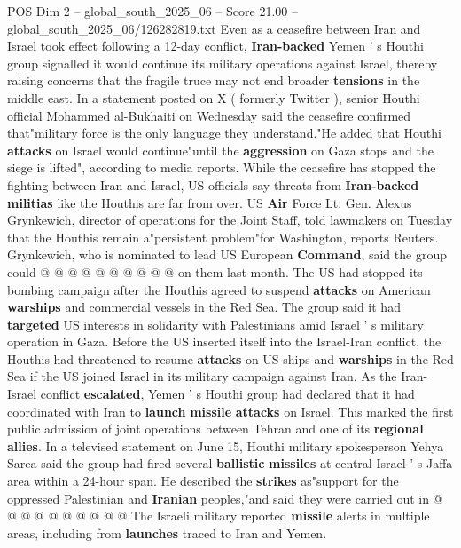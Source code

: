 \begin{textsample}{POS Dim 2 – global\_south\_2025\_06 – Score 21.00 – global\_south\_2025\_06/126282819.txt}  \label{ex:f2_pos_246}
Even as a ceasefire between Iran and Israel took effect following a 12-day conflict, \textbf{Iran-backed} Yemen ' s Houthi group signalled it would continue its military operations against Israel, thereby raising concerns that the fragile truce may not end broader \textbf{tensions} in the middle east.
In a statement posted on X ( formerly Twitter ), senior Houthi official Mohammed al-Bukhaiti on Wednesday said the ceasefire confirmed that"military force is the only language they understand."He added that Houthi \textbf{attacks} on Israel would continue"until the \textbf{aggression} on Gaza stops and the siege is lifted", according to media reports.
While the ceasefire has stopped the fighting between Iran and Israel, US officials say threats from \textbf{Iran-backed} \textbf{militias} like the Houthis are far from over.
US \textbf{Air} Force Lt.
Gen.
Alexus Grynkewich, director of operations for the Joint Staff, told lawmakers on Tuesday that the Houthis remain a"persistent problem"for Washington, reports Reuters.
Grynkewich, who is nominated to lead US European \textbf{Command}, said the group could @ @ @ @ @ @ @ @ @ @ on them last month.
The US had stopped its bombing campaign after the Houthis agreed to suspend \textbf{attacks} on American \textbf{warships} and commercial vessels in the Red Sea.
The group said it had \textbf{targeted} US interests in solidarity with Palestinians amid Israel ' s military operation in Gaza.
Before the US inserted itself into the Israel-Iran conflict, the Houthis had threatened to resume \textbf{attacks} on US ships and \textbf{warships} in the Red Sea if the US joined Israel in its military campaign against Iran.
As the Iran-Israel conflict \textbf{escalated}, Yemen ' s Houthi group had declared that it had coordinated with Iran to \textbf{launch} \textbf{missile} \textbf{attacks} on Israel.
This marked the first public admission of joint operations between Tehran and one of its \textbf{regional} \textbf{allies}.
In a televised statement on June 15, Houthi military spokesperson Yehya Sarea said the group had fired several \textbf{ballistic} \textbf{missiles} at central Israel ' s Jaffa area within a 24-hour span.
He described the \textbf{strikes} as"support for the oppressed Palestinian and \textbf{Iranian} peoples,"and said they were carried out in @ @ @ @ @ @ @ @ @ @ The Israeli military reported \textbf{missile} alerts in multiple areas, including from \textbf{launches} traced to Iran and Yemen.

\end{textsample}
